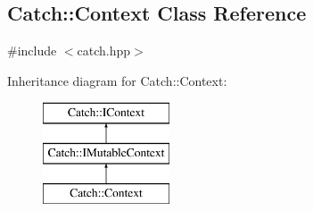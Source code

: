 \hypertarget{classCatch_1_1Context}{\subsection{Catch\-:\-:Context Class Reference}
\label{classCatch_1_1Context}
}


{\ttfamily \#include $<$catch.\-hpp$>$}

Inheritance diagram for Catch\-:\-:Context\-:\begin{figure}[H]
\begin{center}
\leavevmode
\includegraphics[height=3.000000cm]{classCatch_1_1Context}
\end{center}
\end{figure}
